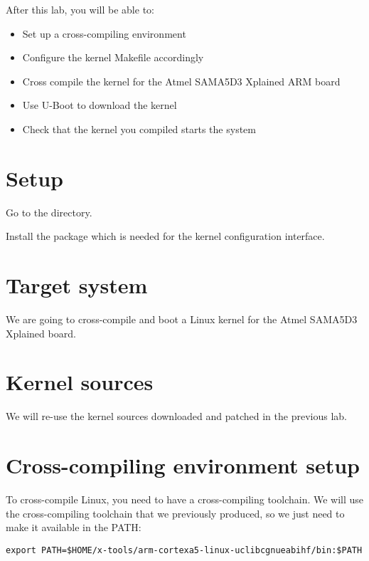 
After this lab, you will be able to:
\begin{itemize}
\item Set up a cross-compiling environment
\item Configure the kernel Makefile accordingly
\item Cross compile the kernel for the Atmel SAMA5D3 Xplained ARM board
\item Use U-Boot to download the kernel
\item Check that the kernel you compiled starts the system
\end{itemize}

\section{Setup}

Go to the  directory.

Install the package  which is needed for the
 kernel configuration interface.

\section{Target system}

We are going to cross-compile and boot a Linux kernel for the Atmel
SAMA5D3 Xplained board.

\section{Kernel sources}

We will re-use the kernel sources downloaded and patched in the
previous lab.

\section{Cross-compiling environment setup}

To cross-compile Linux, you need to have a cross-compiling
toolchain. We will use the cross-compiling toolchain that we
previously produced, so we just need to make it available in the PATH:

\begin{verbatim}
export PATH=$HOME/x-tools/arm-cortexa5-linux-uclibcgnueabihf/bin:$PATH
\end{verbatim}

